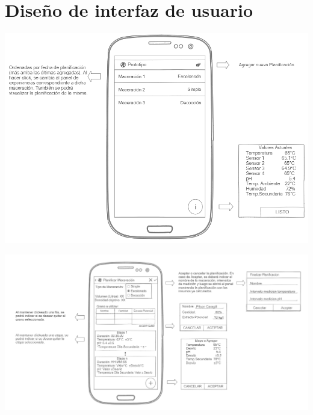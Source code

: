    \begin{minipage}{0.95\textwidth}
    \chapter{Diseño de interfaz de usuario}
        \centering
        \includegraphics[scale=0.55]{Anexo/MockUp/MainActivity.jpg}
        \label{fig:MockUpMainActivity}
    \end{minipage}
    
    \begin{minipage}{0.95\textwidth}

        \centering
        \includegraphics[scale=0.55, angle =90]{Anexo/MockUp/PlanningActivity.jpg}
        \label{fig:MockUpPlanningActivity}
    \end{minipage}
    

